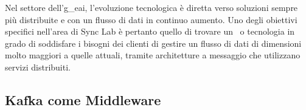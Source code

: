 Nel settore dell'\gls{g_eai}, l'evoluzione tecnologica è diretta verso soluzioni sempre più distribuite e con un flusso di dati in continuo aumento.
Uno degli obiettivi specifici nell'area  di Sync Lab è pertanto quello di trovare un \software\ o tecnologia in grado di soddisfare i bisogni dei clienti di gestire un flusso di dati di dimensioni molto maggiori a quelle attuali, tramite architetture a messaggio che utilizzano servizi distribuiti.

%
%
%
%


\subsection{Kafka come Middleware}


